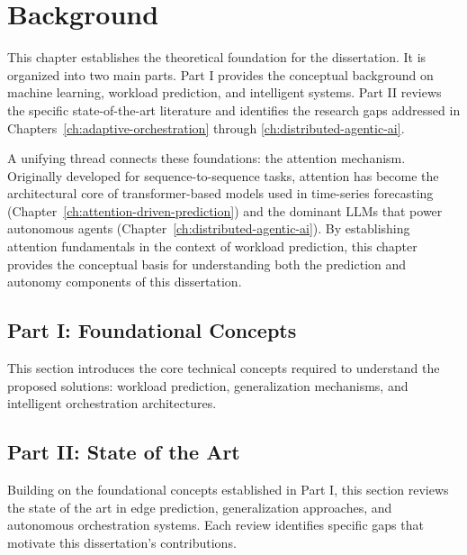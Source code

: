 \chapter{Background}
\label{ch:background}

This chapter establishes the theoretical foundation for the dissertation. It is organized into two main parts. Part I provides the conceptual background on machine learning, workload prediction, and intelligent systems. Part II reviews the specific state-of-the-art literature and identifies the research gaps addressed in Chapters~\ref{ch:adaptive-orchestration} through \ref{ch:distributed-agentic-ai}.

A unifying thread connects these foundations: the attention mechanism. Originally developed for sequence-to-sequence tasks, attention has become the architectural core of transformer-based models used in time-series forecasting (Chapter~\ref{ch:attention-driven-prediction}) and the dominant \acp{LLM} that power autonomous agents (Chapter~\ref{ch:distributed-agentic-ai}). By establishing attention fundamentals in the context of workload prediction, this chapter provides the conceptual basis for understanding both the prediction and autonomy components of this dissertation.

\section{Part I: Foundational Concepts}
\label{sec:ch2_part1}

This section introduces the core technical concepts required to understand the proposed solutions: workload prediction, generalization mechanisms, and intelligent orchestration architectures.





\section{Part II: State of the Art}
\label{sec:ch2_part2}

Building on the foundational concepts established in Part I, this section reviews the state of the art in edge prediction, generalization approaches, and autonomous orchestration systems. Each review identifies specific gaps that motivate this dissertation's contributions.

